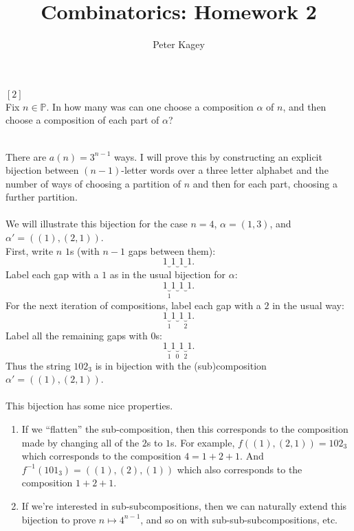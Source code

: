 \documentclass{article}
\newenvironment{problem}[2][Problem]{\begin{trivlist}
\item[\hskip \labelsep {\bfseries #1}\hskip \labelsep {\bfseries #2.}]}{\end{trivlist}}
\newenvironment{solution}[1][Solution.]{\begin{trivlist}
\item[\hskip \labelsep {\bfseries #1}]}{\end{trivlist}}
\begin{document}
\title{Combinatorics: Homework 2}
\author{Peter Kagey}

\maketitle

\begin{problem}{21} $[2]$ \\
  Fix $n \in \mathbb P$. In how many was can one choose a composition $\alpha$
  of $n$, and then choose a composition of each part of $\alpha$?
\end{problem}

\begin{solution} \text{} \\
  There are $a(n) = 3^{n-1}$ ways. I will prove this by constructing an explicit
  bijection between $(n-1)$-letter words over a three letter alphabet and the
  number of ways of choosing a partition of $n$ and then for each part, choosing
  a further partition.
  \\~\\
  We will illustrate this bijection for the case $n = 4$, $\alpha = (1, 3)$, and
  $\alpha' = ((1), (2, 1))$.\\
  First, write $n$ $1$s (with $n-1$ gaps between them): \[
      1 \underbrace{} 1 \underbrace{} 1 \underbrace{} 1.
  \]
  Label each gap with a $1$ as in the usual bijection for $\alpha$: \[
      1 \underbrace{}_1 1 \underbrace{} 1 \underbrace{} 1.
  \]
  For the next iteration of compositions, label each gap with a $2$ in the
  usual way: \[
    1 \underbrace{}_1 1 \underbrace{} 1 \underbrace{}_2 1.
  \]
  Label all the remaining gaps with $0$s: \[
    1 \underbrace{}_1 1 \underbrace{}_0 1 \underbrace{}_2 1.
  \]
  Thus the string $102_3$ is in bijection with the (sub)composition
  $\alpha' = ((1), (2, 1))$.
  \\~\\
  This bijection has some nice properties.
  \begin{enumerate}
    \item If we ``flatten'' the sub-composition,
      then this corresponds to the composition made by changing all of the $2$s to
      $1$s. For example, $f((1), (2, 1)) = 102_3$ which corresponds to the
      composition $4 = 1 + 2 + 1$. And $f^{-1}(101_3) = ((1), (2), (1))$ which also
      corresponds to the composition $1 + 2 + 1$.
    \item If we're interested in sub-subcompositions, then we can naturally
    extend this bijection to prove $n \mapsto 4^{n - 1}$, and so on with
    sub-sub-subcompositions, etc.
  \end{enumerate}
\end{solution}
\end{document}
